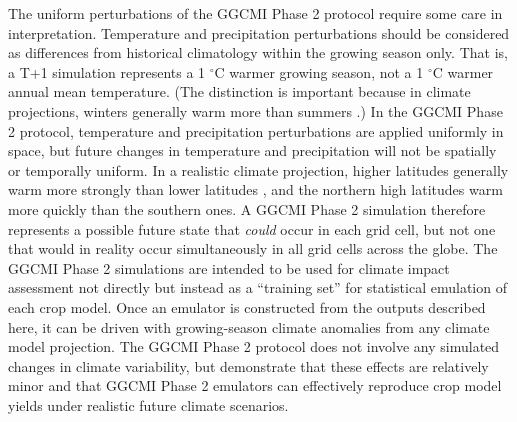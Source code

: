 \documentclass[gmd, manuscript]{copernicus} %
\begin{document}
The uniform perturbations of the GGCMI Phase 2 protocol require some care in interpretation. Temperature and precipitation perturbations should be considered as differences from historical climatology within the growing season only. That is, a T+1 simulation represents a 1 $^{\circ}$C warmer growing season, not a 1 $^{\circ}$C warmer annual mean temperature.
(The distinction is important because in climate projections, winters generally warm more than summers \citep[e.g.][]{Haugen2018}.) 
In the GGCMI Phase 2 protocol, temperature and precipitation perturbations are applied uniformly in space, but future changes in temperature and precipitation will not be spatially or temporally uniform.
In a realistic climate projection, higher latitudes generally warm more strongly than lower latitudes \citep[e.g.][]{Hansen1997}, and the northern high latitudes warm more quickly than the southern ones.
A GGCMI Phase 2 simulation therefore represents a possible future state that \textit{could} occur in each grid cell, but not one that would in reality occur simultaneously in all grid cells across the globe.  %
The GGCMI Phase 2 simulations are intended to be used for climate impact assessment not directly but instead as a ``training set'' for statistical emulation of each crop model. Once an emulator is constructed from the outputs described here, it can be driven with growing-season climate anomalies from any climate model projection.  The GGCMI Phase 2 protocol does not involve any simulated changes in climate variability, but
\cite{Franke2020} demonstrate that these effects are relatively minor and that GGCMI Phase 2 emulators can effectively reproduce crop model yields under realistic future climate scenarios.
\end{document}
